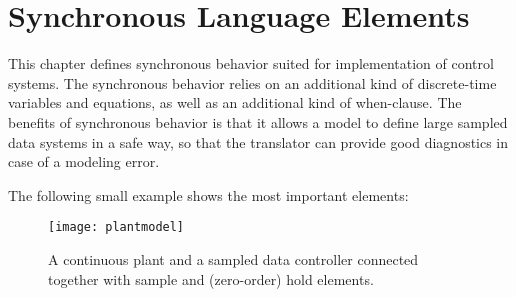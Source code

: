 \chapter{Synchronous Language Elements}\label{synchronous-language-elements}

This chapter defines synchronous
behavior suited for implementation of control systems.
The synchronous behavior relies on an additional kind of discrete-time
variables and equations, as well as an additional kind of when-clause.
The benefits of synchronous behavior is that it allows a model to define large
sampled data systems in a safe way, so that the
translator can provide good diagnostics in case of a modeling error.

The following small example shows the most important elements:
\begin{figure}[H]
  \begin{center}
    \texttt{[image: plantmodel]}
  \end{center}
  \caption{A continuous plant and a sampled data controller connected together with sample and (zero-order) hold elements.}
\end{figure}

